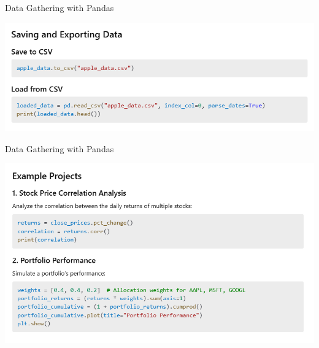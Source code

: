 \documentclass[11pt]{beamer}
\begin{document}
\begin{frame}{Data Gathering with Pandas}
	\begin{center}
	\includegraphics[scale=0.55]{../05-pictures/lesson-1-3_pic_19.png}
	\end{center}
\end{frame}
\begin{frame}{Data Gathering with Pandas}
	\begin{center}
	\includegraphics[scale=0.55]{../05-pictures/lesson-1-3_pic_20.png}
	\end{center}
\end{frame}
\end{document}
